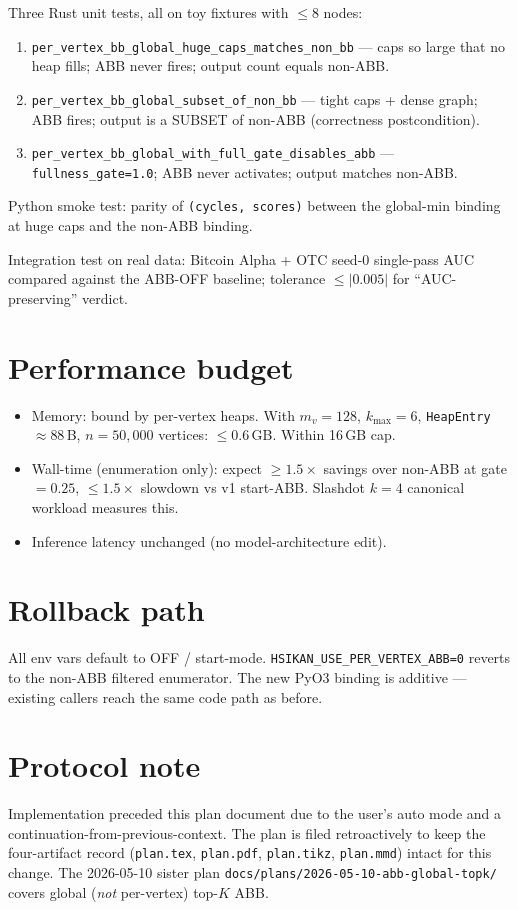 \documentclass[10pt]{article}
\begin{document}
Three Rust unit tests, all on toy fixtures with $\le 8$ nodes:
\begin{enumerate}
  \item \texttt{per\_vertex\_bb\_global\_huge\_caps\_matches\_non\_bb}
    --- caps so large that no heap fills; ABB never fires;
    output count equals non-ABB.
  \item \texttt{per\_vertex\_bb\_global\_subset\_of\_non\_bb} ---
    tight caps + dense graph; ABB fires; output is a SUBSET of
    non-ABB (correctness postcondition).
  \item \texttt{per\_vertex\_bb\_global\_with\_full\_gate\_disables\_abb}
    --- \texttt{fullness\_gate=1.0}; ABB never activates; output
    matches non-ABB.
\end{enumerate}

Python smoke test:
parity of \texttt{(cycles, scores)} between the global-min binding
at huge caps and the non-ABB binding.

Integration test on real data:
Bitcoin Alpha + OTC seed-0 single-pass AUC compared against the
ABB-OFF baseline; tolerance $\le |0.005|$ for ``AUC-preserving''
verdict.

\section*{Performance budget}

\begin{itemize}
  \item Memory: bound by per-vertex heaps. With $m_v{=}128$,
    $k_{\max}{=}6$, \texttt{HeapEntry} $\approx 88$\,B,
    $n{=}50{,}000$ vertices: $\le 0.6$\,GB. Within 16\,GB cap.
  \item Wall-time (enumeration only): expect $\ge 1.5\times$ savings
    over non-ABB at gate$=0.25$, $\le 1.5\times$ slowdown vs v1
    start-ABB. Slashdot $k{=}4$ canonical workload measures this.
  \item Inference latency unchanged (no model-architecture edit).
\end{itemize}

\section*{Rollback path}

All env vars default to OFF / start-mode.
\texttt{HSIKAN\_USE\_PER\_VERTEX\_ABB=0} reverts to the non-ABB
filtered enumerator. The new PyO3 binding is additive --- existing
callers reach the same code path as before.

\section*{Protocol note}

Implementation preceded this plan document due to the user's auto
mode and a continuation-from-previous-context. The plan is filed
retroactively to keep the four-artifact record (\texttt{plan.tex},
\texttt{plan.pdf}, \texttt{plan.tikz}, \texttt{plan.mmd}) intact
for this change. The 2026-05-10 sister plan
\texttt{docs/plans/2026-05-10-abb-global-topk/} covers global
(\emph{not} per-vertex) top-$K$ ABB.
\end{document}
